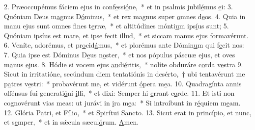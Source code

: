 2. Præoccupémus fáciem ejus in conf\uline{e}ssi\uline{ó}ne,~* et in psalmis jubil\uline{é}mus \uline{e}i:
3. Quóniam Deus m\uline{a}gnus D\uline{ó}minus,~* et rex magnus super \uline{o}mnes d\uline{e}os.
4. Quia in manu ejus sunt omnes f\uline{i}nes t\uline{e}rræ,~* et altitúdines mónti\uline{u}m ips\uline{í}us sunt;
5. Quóniam ipsíus est mare, et ipse f\uline{e}cit \uline{i}llud,~* et siccam manus ejus f\uline{o}rmav\uline{é}runt.
6. Veníte, adorémus, et pr\uline{o}cid\uline{á}mus,~* et plorémus ante Dómin\uline{u}m qui f\uline{e}cit nos:
7. Quia ipse est Dóminus D\uline{e}us n\uline{o}ster,~* et nos pópulus páscuæ ejus, et oves m\uline{a}nus \uline{e}jus.
8. Hódie si vocem ejus \uline{au}di\uline{é}ritis,~* nolíte obduráre c\uline{o}rda v\uline{e}stra
9. Sicut in irritatióne, secúndum diem tentatiónis in desérto,~† ubi tentavérunt me p\uline{a}tres v\uline{e}stri:~* probavérunt me, et vidérunt \uline{ó}pera m\uline{e}a.
10. Quadragínta annis offénsus fui generati\uline{ó}ni \uline{i}lli,~* et dixi: Semper hi \uline{e}rrant c\uline{o}rde.
11. Et isti non cognovérunt vias meas: ut jurávi in \uline{i}ra m\uline{e}a:~* Si introíbunt in r\uline{é}quiem m\uline{e}am.
12. Glória P\uline{a}tri, et F\uline{í}lio,~* et Spir\uline{í}tui S\uline{a}ncto.
13. Sicut erat in princípio, et n\uline{u}nc, et s\uline{e}mper,~* et in sǽcula sæcul\uline{ó}rum. \uline{A}men.
